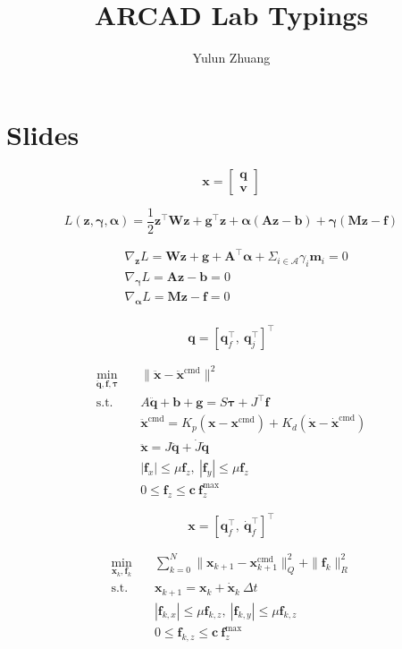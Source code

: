 \documentclass[11pt]{article}
\newcommand{\grad}{\nabla}
\newcommand{\half}{\frac{1}{2}} %
\newcommand{\T}{^\top}          %
\begin{document}
\title{ARCAD Lab Typings}
\author{Yulun Zhuang}
\maketitle
\section*{Slides}


\[
\bm x = 
\begin{bmatrix}
    \bm q \\ \bm v
\end{bmatrix}
\]

\[
L(\bm z, \bm \gamma, \bm \alpha) = \half \bm z\T \bm W\bm z + \bm g\T \bm z + \bm \alpha (\bm A\bm z - \bm b) + \bm \gamma (\bm M\bm z - \bm f)
\]
    
\begin{align*}
    & \grad_{\bm z} L = \bm W \bm z + \bm g +\bm A\T\bm \alpha+ \Sigma_{i\in\mathcal{A}}\gamma_i \bm m_i = 0\\
    & \grad_{\bm \gamma} L = \bm A\bm z - \bm b = 0\\
    & \grad_{\bm \alpha} L = \bm M\bm z - \bm f = 0\\
\end{align*}

\clearpage

\[
\bm{q} = [\bm{q}_f\T,\ \bm{q}_j\T]\T
\]

\begin{align*}
  \min_{\ddot{\bm{q}}, \mathbf{f}, \bm{\tau}} \quad
  & \|\ddot{\mathbf{x}} - \ddot{\mathbf{x}}^{\text{cmd}}\|^2\\
  \text{s.t.} \quad
  & A \ddot{\bm{q}} + \bm{b} + \bm{g} = S \bm{\tau} + J\T \mathbf{f}\\
  & \ddot{\mathbf{x}}^{\text{cmd}} = K_p (\mathbf{x} - \mathbf{x}^{\text{cmd}}) + K_d (\dot{\mathbf{x}} - \dot{\mathbf{x}}^{\text{cmd}})\\
  & \ddot{\mathbf{x}} = J\ddot{\bm{q}} + \dot{J} \dot{\bm{q}}\\
  & |\mathbf{f}_{x}| \leq \mu \mathbf{f}_{z}, \ 
  |\mathbf{f}_{y}| \leq \mu \mathbf{f}_{z}\\
  & 0 \leq \mathbf{f}_{z} \leq  \mathbf{c} \ \mathbf{f}_{z}^{\text{max}}
\end{align*}

\[
\mathbf{x} = [\bm{q}_f\T,\ \dot{\bm{q}}_f\T]\T
\]

\begin{align*}
  \min_{\mathbf{x}_k, \mathbf{f}_k} \quad
  & \sum_{k=0}^{N}\|\mathbf{x}_{k+1} - \mathbf{x}^{\text{cmd}}_{k+1}\|^2_{Q} + \|\mathbf{f}_k\|^2_{R}\\
  \text{s.t.} \quad
  & \mathbf{x}_{k+1} = \mathbf{x}_k + \dot{\mathbf{x}}_k \ \Delta t\\
  & |\mathbf{f}_{k, x}| \leq \mu \mathbf{f}_{k, z}, \ 
  |\mathbf{f}_{k, y}| \leq \mu \mathbf{f}_{k, z}\\
  & 0 \leq \mathbf{f}_{k, z} \leq  \mathbf{c} \ \mathbf{f}_{z}^{\text{max}}
\end{align*}
\end{document}
